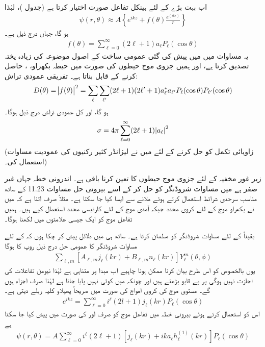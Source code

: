 اب بہت بڑے  کے لئے  ہینکل تفاعل  صورت اختیار کرتا ہے (جدول  )،  لہٰذا
\begin{align}
	\psi(r, \theta)\approx A\left\{e^{ikz}+f(\theta)\frac{e^{(ikr)}}{r}\right\}
\end{align}
ہو گا، جہاں  درج ذیل ہے۔
\begin{align}
	f(\theta) = \sum_{\ell=0}^{\infty}(2\ell +1)a_{\ell}P_{\ell}(\cos\theta)
\end{align}
یہ مساوات   میں میں پیش کی گئی عمومی ساخت کے اصول موضوعہ کی زیادہ پختہ  تصدیق کرتا ہے،  اور ہمیں  جزوی موج حیطوں  کی صورت میں حیطہ بکھراو، ،  حاصل  کرنے کے قابل بناتا ہے۔ تفریقی عمودی تراش:
\begin{align}
	D(\theta) = \abs{f(\theta)}^2 = \sum_{\ell}\sum_{\ell^\prime}(2\ell+1)(2\ell^\prime+1)a^*_{\ell}a_{\ell^\prime}P_{\ell}(\cos\theta)P_{\ell^\prime}(\cos\theta)
\end{align}
ہو گا، اور کل عمودی تراش درج ذیل ہوگا۔
\begin{align}
	\sigma=4\pi\sum_{\ell=0}^{\infty}(2\ell+1)\abs{a_{\ell}}^2
\end{align}
(زاویائی تکمل کو حل کرنے کے لئے میں نے لیژانڈر کثیر رکنیوں کی عمودیت مساوات   استعمال کی۔)


زیر غور مخفیہ کے لئے جزوی موج حیطوں  کا تعین کرنا باقی ہے۔ اندرونی خطہ جہاں  غیر صفر ہے میں مساوات شروڈنگر کو حل کر کے اسے بیرونی حل مساوات \num{11.23} کے ساتھ مناسب سرحدی شرائط استعمال کرتے ہوئے ملانے سے ایسا کیا جا سکتا ہے۔ مثلاً صرف اتنا ہے کہ میں نے بکھراو موج کے لئے کروی محدد جبکہ آمدی موج کے لئے کارتیسی محدد استعمال کیے  ہیں۔ ہمیں تفاعل موج کو ایک جیسی علامتوں میں لکھنا ہوگا۔

یقیناً  کے لئے مساوات شروڈنگر کو  مطمئن کرتا ہے۔ ساتھ ہی میں دلائل پیش کر چکا ہوں کہ  کے لئے مساوات شروڈنگر کا عمومی حل درج ذیل روپ کا ہوگا
\begin{align*}
	\sum_{\ell, m}\left[A_{\ell, m}j_{\ell}(kr)+B_{\ell, m}n_{\ell}(kr)\right]Y_{\ell}^m(\theta, \phi)
\end{align*}
یوں بالخصوص  کو اس طرح بیان کرنا ممکن ہونا چاہیے اب مبدا پر  متناہی ہے لہٰذا نیومن تفاعلات کی اجازت نہیں ہوگی  پر  بے قابو بڑھتے ہیں اور چونکہ  میں کوئی  نہیں پایا جاتا ہے لہٰذا صرف  اجزاء ہوں گے۔ مستوی موج کی کروی امواج کی صورت میں صریحاً پھیلاو کلیہ ریلے دیتی ہے۔
\begin{align}
	e^{ikz} = \sum_{\ell=0}^{\infty}i^{\ell}(2l+1)j_{\ell}(kr)P_{\ell}(\cos\theta)
\end{align}
اس کو استعمال کرتے ہوئے بیرونی خطہ میں تفاعل موج کو صرف  اور  کی صورت میں پیش کیا جا سکتا ہے
\begin{align}
	\psi(r, \theta) = A\sum_{\ell=0}^{\infty}i^{\ell}(2\ell+1)\left[j_{\ell}(kr)+ika_{\ell}h_{\ell}^{(1)}(kr)\right]P_{\ell}(\cos\theta)
\end{align}

